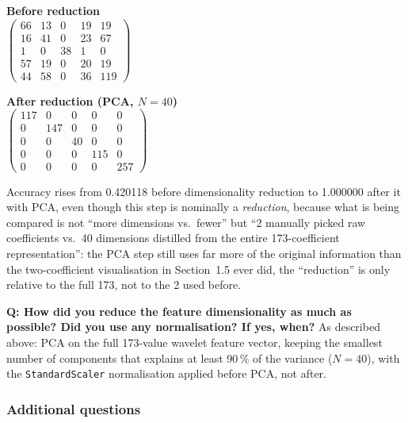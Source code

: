 \documentclass[11pt,a4paper]{article}
\newcommand{\percent}{\%}
\newcommand{\num}[1]{#1}
\newcommand{\SI}[2]{#1\,#2}
\begin{document}
\begin{table}[htbp]
\centering
\begin{minipage}{0.48\textwidth}
\centering
\textbf{Before reduction} \\[2pt]
$\begin{pmatrix}
66 & 13 & 0 & 19 & 19 \\
16 & 41 & 0 & 23 & 67 \\
1 & 0 & 38 & 1 & 0 \\
57 & 19 & 0 & 20 & 19 \\
44 & 58 & 0 & 36 & 119
\end{pmatrix}$
\end{minipage}
\hfill
\begin{minipage}{0.48\textwidth}
\centering
\textbf{After reduction (PCA, $N=40$)} \\[2pt]
$\begin{pmatrix}
117 & 0 & 0 & 0 & 0 \\
0 & 147 & 0 & 0 & 0 \\
0 & 0 & 40 & 0 & 0 \\
0 & 0 & 0 & 115 & 0 \\
0 & 0 & 0 & 0 & 257
\end{pmatrix}$
\end{minipage}
\caption{Confusion matrices before and after dimensionality reduction.}
\label{tab:cmcompare}
\end{table}

Accuracy rises from \num{0.420118} before dimensionality reduction to \num{1.000000} after it
with PCA, even though this step is nominally a \emph{reduction}, because what is being compared
is not ``more dimensions vs.\ fewer'' but
``\num{2} manually picked raw coefficients vs.\ \num{40} dimensions distilled from the entire
\num{173}-coefficient representation'': the PCA step still uses far more of the original
information than the two-coefficient visualisation in Section~1.5 ever did, the ``reduction'' is
only relative to the full \num{173}, not to the \num{2} used before.

\textbf{Q: How did you reduce the feature dimensionality as much as possible? Did you use any
normalisation? If yes, when?} As described above: PCA on the full \num{173}-value wavelet
feature vector, keeping the smallest number of components that explains at least
\SI{90}{\percent} of the variance ($N=\num{40}$), with the \texttt{StandardScaler} normalisation
applied before PCA, not after.

\subsubsection{Additional questions}
\end{document}
